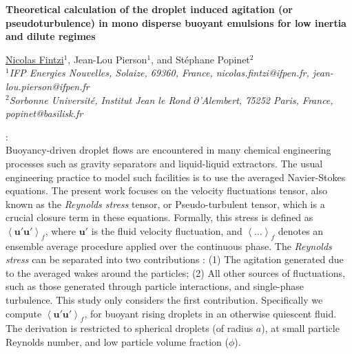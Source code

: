 \documentclass[12pt,a4paper]{article}
\newcommand{\avg}[1]{\left<#1\right>}
\renewcommand{\avg}[1]{\left<#1\right>}
\begin{document}
\pagestyle{fancy}
\fancyhf{}

\lhead{\textcolor{mygray}{12th International Conference on Multiphase flow}}
\rhead{\textcolor{mygray}{ICMF 2025, Toulouse, France, May 12-16, 2025}}
\lfoot{}
\cfoot{}
\rfoot{}

\begin{center}
{\large {\bf Theoretical calculation of the droplet induced agitation (or pseudoturbulence) in mono disperse buoyant emulsions for low inertia and dilute regimes}}
\vspace{10pt}


\underline{Nicolas Fintzi}$^1$, Jean-Lou Pierson$^1$, and St\'ephane Popinet$^2$\\
{\it
$^1$IFP Energies Nouvelles, Solaize, 69360, France, nicolas.fintzi@ifpen.fr, jean-lou.pierson@ifpen.fr\\
$^2$Sorbonne Universit\'e, Institut Jean le Rond $\partial$'Alembert, 75252 Paris, France, popinet@basilisk.fr\\
}
\end{center}

\vspace{10pt}
:\\
Buoyancy-driven droplet flows are encountered in many chemical engineering processes such as gravity separators and liquid-liquid extractors. 
The usual engineering practice to model such facilities is to use the averaged Navier-Stokes equations. 
The present work focuses on the velocity fluctuations tensor, also known as the \textit{Reynolds stress} tensor, or Pseudo-turbulent tensor, which is a crucial closure term in these equations.
Formally, this stress is defined as $\avg{ \textbf{u}' \textbf{u}'}_f$, where $\textbf{u}'$ is the fluid velocity fluctuation, and $\avg{\ldots}_f$ denotes an ensemble average procedure applied over the continuous phase. 
The \textit{Reynolds stress} can be separated into two contributions : (1) The agitation generated due to the averaged wakes around the particles; (2) All other sources of fluctuations, such as those generated through particle interactions, and single-phase turbulence. %
This study only considers the first contribution. 
Specifically we compute $\avg{ \textbf{u}' \textbf{u}'}_f$, for buoyant rising droplets in an otherwise quiescent fluid. 
The derivation is restricted to spherical droplets (of radius $a$), at small particle Reynolds number, and low particle volume fraction ($\phi$). 
    \vspace{10pt}
\end{document}
